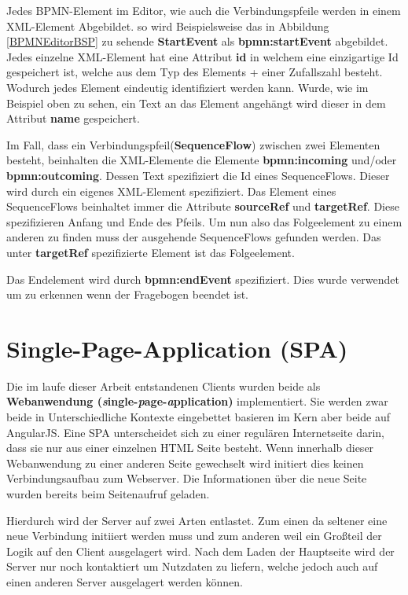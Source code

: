Jedes BPMN-Element im Editor, wie auch die Verbindungspfeile werden in einem XML-Element Abgebildet. so wird Beispielsweise das in Abbildung \ref{BPMNEditorBSP} zu sehende \textbf{StartEvent} als \textbf{bpmn:startEvent} abgebildet. Jedes einzelne XML-Element hat eine Attribut \textbf{id} in welchem eine einzigartige Id gespeichert ist, welche aus dem Typ des Elements + einer Zufallszahl besteht. Wodurch jedes Element eindeutig identifiziert werden kann. Wurde, wie im Beispiel oben zu sehen, ein Text an das Element angehängt wird dieser in dem Attribut \textbf{name} gespeichert.

Im Fall, dass ein Verbindungspfeil(\textbf{SequenceFlow}) zwischen zwei Elementen besteht, beinhalten die XML-Elemente die Elemente \textbf{bpmn:incoming} und/oder \textbf{bpmn:outcoming}. Dessen Text spezifiziert die Id eines SequenceFlows. Dieser wird durch ein eigenes XML-Element spezifiziert. Das Element eines SequenceFlows beinhaltet immer die Attribute \textbf{sourceRef} und \textbf{targetRef}. Diese spezifizieren Anfang und Ende des Pfeils. Um nun also das Folgeelement zu einem anderen zu finden muss der ausgehende SequenceFlows gefunden werden. Das unter \textbf{targetRef} spezifizierte Element ist das Folgeelement.

Das Endelement wird durch \textbf{bpmn:endEvent} spezifiziert. Dies wurde verwendet um zu erkennen wenn der Fragebogen beendet ist.

\section{Single-Page-Application (SPA)}\label{Single-Page-Application}
Die im laufe dieser Arbeit entstandenen Clients  wurden beide als \textbf{Webanwendung (\textit{s}ingle-\textit{p}age-\textit{a}pplication)} implementiert. Sie werden zwar beide in Unterschiedliche Kontexte eingebettet basieren im Kern aber beide auf AngularJS. Eine SPA unterscheidet sich zu einer regulären Internetseite darin, dass sie nur aus einer einzelnen HTML Seite besteht. Wenn innerhalb dieser Webanwendung zu einer anderen Seite gewechselt wird initiert dies keinen Verbindungsaufbau zum Webserver. Die Informationen über die neue Seite wurden bereits beim Seitenaufruf geladen.

Hierdurch wird der Server auf zwei Arten entlastet. Zum einen da seltener eine neue Verbindung initiiert werden muss und zum anderen weil ein Großteil der Logik auf den Client ausgelagert wird. Nach dem Laden der Hauptseite wird der Server nur noch kontaktiert um Nutzdaten zu liefern, welche jedoch auch auf einen anderen Server ausgelagert werden können.

